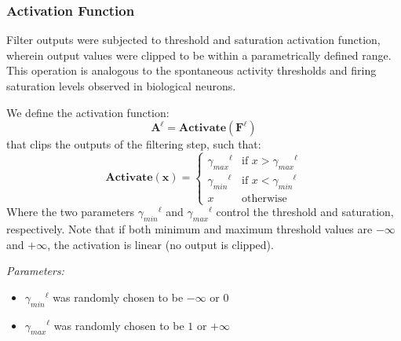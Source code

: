 \subsubsection{Activation Function}

Filter outputs were subjected to threshold and saturation activation function,
wherein output values were clipped to be within a parametrically defined range.
This operation is analogous to the spontaneous activity thresholds and firing
saturation levels observed in biological neurons.

We define the activation function:
\begin{equation}
\mathbf{A^{\ell} = Activate(F^{\ell})}
\end{equation}
that clips the outputs of the filtering step, such that:
\begin{equation}\label{eq:activ}
	\mathbf{Activate(x)} = \left\{
	\begin{array}{ll}
		{\gamma_{max}}^{\ell} & \mbox{if $x >
                  {\gamma_{max}}^{\ell}$}\\ {\gamma_{min}}^{\ell} & \mbox{if $x
                  < {\gamma_{min}}^{\ell}$}\\ x& \mbox{otherwise}
	\end{array}
	\right.
\end{equation} 
Where the two parameters ${\gamma_{min}}^{\ell}$ and ${\gamma_{max}}^{\ell}$
control the threshold and saturation, respectively.  Note that if both minimum
and maximum threshold values are $-\infty$ and $+\infty$, the activation is
linear (no output is clipped).

\emph{Parameters:}
\begin{itemize}
\item ${\gamma_{min}}^{\ell}$ was randomly chosen to be $-\infty$ or $0$
\item ${\gamma_{max}}^{\ell}$ was randomly chosen to be $1$ or $+\infty$
\end{itemize}

